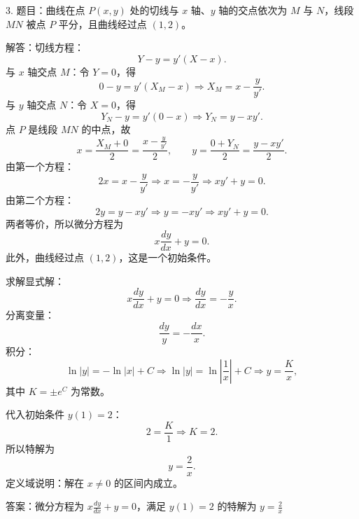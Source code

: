 3. 题目：曲线在点 \(P(x,y)\) 处的切线与 \(x\) 轴、\(y\) 轴的交点依次为 \(M\) 与 \(N\)，线段 \(MN\) 被点 \(P\) 平分，且曲线经过点 \((1,2)\)。

解答：切线方程：
\[ Y-y=y'(X-x). \]
与 \(x\) 轴交点 \(M\)：令 \(Y=0\)，得
\[ 0-y=y'(X_{M}-x)\Rightarrow X_{M}=x-\frac{y}{y'}. \]
与 \(y\) 轴交点 \(N\)：令 \(X=0\)，得
\[ Y_{N}-y=y'(0-x)\Rightarrow Y_{N}=y-xy'. \]
点 \(P\) 是线段 \(MN\) 的中点，故
\[ x=\frac{X_{M}+0}{2}=\frac{x-\frac{y}{y'}}{2},\qquad y=\frac{0+Y_{N}}{2}=\frac{y-xy'}{2}. \]
由第一个方程：
\[ 2x=x-\frac{y}{y'}\Rightarrow x=-\frac{y}{y'}\Rightarrow xy'+y=0. \]
由第二个方程：
\[ 2y=y-xy'\Rightarrow y=-xy'\Rightarrow xy'+y=0. \]
两者等价，所以微分方程为
\[ x\frac{dy}{dx}+y=0. \]
此外，曲线经过点 \((1,2)\)，这是一个初始条件。

求解显式解：
\[ x\frac{dy}{dx}+y=0\Rightarrow\frac{dy}{dx}=-\frac{y}{x}. \]
分离变量：
\[ \frac{dy}{y}=-\frac{dx}{x}. \]
积分：
\[ \ln|y|=-\ln|x|+C\Rightarrow\ln|y|=\ln\left|\frac{1}{x}\right|+C\Rightarrow y=\frac{K}{x}, \]
其中 \(K=\pm e^{C}\) 为常数。

代入初始条件 \(y(1)=2\)：
\[ 2=\frac{K}{1}\Rightarrow K=2. \]
所以特解为
\[ y=\frac{2}{x}. \]
定义域说明：解在 \(x\ne0\) 的区间内成立。

答案：微分方程为 \(x\frac{dy}{dx}+y=0\)，满足 \(y(1)=2\) 的特解为 \(y=\frac{2}{x}\)
